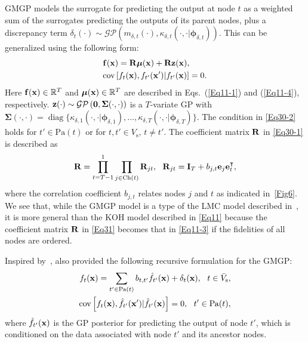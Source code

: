 \documentclass[iicol,sn-basic]{sn-jnl}%
\DeclareMathOperator{\diag}{diag}
\begin{document}
GMGP models the surrogate for predicting the output at node $t$ as a weighted sum of the surrogates predicting the outputs of its parent nodes, plus a discrepancy term $\delta_t(\cdot)\sim \mathcal{GP}\left(m_{\delta,t}(\cdot),\kappa_{\delta,t}(\cdot,\cdot|{\boldsymbol \phi}_{\delta,t})\right)$.
This can be generalized using the following form:
\begin{subequations}\label{Eq30}
	\begin{align}
		&{\bf f}({\bf x}) =  {\bf R} {\boldsymbol \mu}({\bf x}) + {\bf R} {\bf z}({\bf x}) \label{Eq30-1},\\
		&\text{cov}\left[f_{t}({\bf x}),f_{t'}({\bf x}')|f_{t'}({\bf x})\right]=0 \label{Eq30-2}.
\end{align}	
\end{subequations}
Here ${\bf f}({\bf x}) \in \mathbb{R}^T$ and ${\boldsymbol \mu}({\bf x}) \in \mathbb{R}^T$ are described in Eqs.~(\ref{Eq11-1}) and (\ref{Eq11-4}), respectively.
 ${\bf z}(\cdot) \sim \mathcal{GP}\left({\bf 0},{\boldsymbol \Sigma}(\cdot,\cdot)\right)$ is a $T$-variate GP with ${\boldsymbol \Sigma}(\cdot,\cdot) = \diag\{\kappa_{\delta,1}(\cdot,\cdot|{\boldsymbol \phi}_{\delta,1}),\dots,\kappa_{\delta,T}(\cdot,\cdot|{\boldsymbol \phi}_{\delta,T})\}$.
The condition in \cref{Eq30-2} holds for $t' \in  \text{Pa}(t)$ or for $t,t' \in  V_\text{s}, \, t \neq t'$.
The coefficient matrix ${\bf R}$ in \cref{Eq30-1} is described as
\begin{equation}\label{Eq31}
		{\bf R} = \prod_{t=T-1}^1 \prod_{j \in \text{Ch}(t)} {\bf R}_{jt}, \ \ {\bf R}_{jt} = {\bf I}_T + b_{j,t} {\bf e}_j {\bf e}^\intercal_{t},
\end{equation}
where the correlation coefficient $b_{j,t}$ relates nodes $j$ and $t$ as indicated in~\cref{Fig6}.
We see that, while the GMGP model is a type of the LMC model described in~, it is more general than the KOH model described in \cref{Eq11} because the coefficient matrix ${\bf R}$ in \cref{Eq31} becomes that in \cref{Eq11-3} if the fidelities of all nodes are ordered.
		
Inspired by~\cite{Gratiet2014}, \cite{Ji2023} also provided the following recursive formulation for the GMGP:
\begin{subequations}\label{Eq32}
	\begin{align}
		f_t({\bf x}) = \sum_{t' \in \text{Pa}(t)}
		b_{t,t'} \hat{f}_{t'}({\bf x}) + \delta_{t}({\bf x}), \ \  t \in \bar{V}_\text{s}
		\label{Eq32-1},\\
		\text{cov}\left[f_{t}({\bf x}),\hat{f}_{t'}({\bf x}')|\hat{f}_{t'}({\bf x})\right]=0, \ \ t' \in  \text{Pa}(t)
		\label{Eq32-2},
	\end{align}
\end{subequations}
where $\hat{f}_{t'}({\bf x})$ is the GP posterior for predicting the output of node $t'$, which is conditioned on the data associated with node $t'$ and its ancestor nodes.
\end{document}
